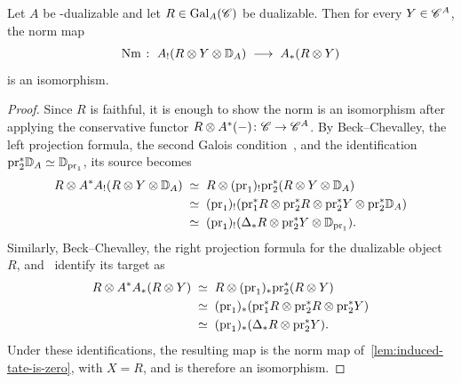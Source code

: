 \documentclass[english,svgnames,table]{article}
\begin{document}
    \begin{corollary}
    \label{cor:Galois-norm-is-iso}
        Let $A$ be \COB-dualizable and let $R\in\mathrm{Gal}_A(\mathscr{C})$ be dualizable. Then for every $Y \in \mathscr{C}^A$, the norm map
        \begin{equation*}
            \operatorname{Nm} \;\colon\; A_!(R\otimes Y\otimes\mathbb{D}_A) \;\longrightarrow\; A_*(R\otimes Y)
        \end{equation*}
        is an isomorphism.
    \end{corollary}
    \begin{proof}
        Since $R$ is faithful, it is enough to show the norm is an isomorphism after applying the conservative functor $R\otimes A^*(-)\colon\mathscr{C}\to\mathscr{C}^A$.
        By Beck--Chevalley, the left projection formula, the second Galois condition~, and the identification $\mathrm{pr}_2^*\mathbb{D}_A\simeq\mathbb{D}_{\mathrm{pr}_1}$, its source becomes
        \begin{equation*}
            \begin{split}
                R\otimes A^*A_!(R\otimes Y \otimes\mathbb{D}_A) 
                & \;\simeq\; R \otimes (\mathrm{pr}_1)_! \mathrm{pr}_2^*(R \otimes Y \otimes \mathbb{D}_A) \\
                & \;\simeq\; (\mathrm{pr}_1)_!(\mathrm{pr}_1^*R \otimes \mathrm{pr}_2^*R \otimes\mathrm{pr}_2^*Y \otimes \mathrm{pr}_2^*\mathbb{D}_A) \\
                & \;\simeq\; (\mathrm{pr}_1)_!(\Delta_*R \otimes \mathrm{pr}_2^*Y \otimes \mathbb{D}_{\mathrm{pr}_1}).
            \end{split}
        \end{equation*}
        Similarly, Beck--Chevalley, the right projection formula for the dualizable object $R$, and~ identify its target as
        \begin{equation*}
            \begin{split}
                R\otimes A^*A_*(R \otimes Y) 
                & \;\simeq\; R \otimes (\mathrm{pr}_1)_*\mathrm{pr}_2^*(R \otimes Y) \\
                & \;\simeq\; (\mathrm{pr}_1)_*(\mathrm{pr}_1^*R \otimes \mathrm{pr}_2^*R \otimes \mathrm{pr}_2^*Y) \\
                & \;\simeq\; (\mathrm{pr}_1)_*(\Delta_*R \otimes \mathrm{pr}_2^*Y).
            \end{split}
        \end{equation*}
        Under these identifications, the resulting map is the norm map of~\cref{lem:induced-tate-is-zero}, with $X=R$, and is therefore an isomorphism.
    \end{proof}
    
\end{document}
